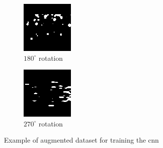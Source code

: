 \documentclass[10pt,twocolumn,letterpaper]{article}
\begin{document}
\begin{figure}[H]
  \begin{subfigure}{0.33\linewidth}
    \includegraphics[width=\linewidth]{img_aug_rot_180}
    \caption{$180^\circ$ rotation}
    \label{fig:img_aug_180}
  \end{subfigure}
  \qquad
  \begin{subfigure}{0.33\linewidth}
    \includegraphics[width=\linewidth]{img_aug_rot_270}
    \caption{$270^\circ$ rotation}
    \label{fig:img_aug_270}
  \end{subfigure}
  \caption{Example of augmented dataset for training the \acrlong{cnn}}
  \label{fig:cnn_aug_imgs}
\end{figure}
\end{document}

